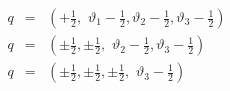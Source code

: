 \begin{equation}
\begin{array}{lll}
q & = & (+\frac{1}{2},\, \, \vartheta _{1}-\frac{1}{2},\vartheta _{2}-\frac{1}{2},\vartheta _{3}-\frac{1}{2})\\
q & = & (\pm \frac{1}{2},\pm \frac{1}{2},\, \, \vartheta _{2}-\frac{1}{2},\vartheta _{3}-\frac{1}{2})\\
q & = & (\pm \frac{1}{2},\pm \frac{1}{2},\pm \frac{1}{2},\, \, \vartheta _{3}-\frac{1}{2})
\end{array}
\end{equation}


